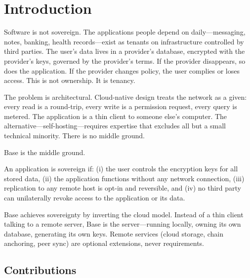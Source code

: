 \section{Introduction}

\label{sec:intro}

Software is not sovereign. The applications people depend on daily---messaging,
notes, banking, health records---exist as tenants on infrastructure controlled
by third parties. The user's data lives in a provider's database, encrypted
with the provider's keys, governed by the provider's terms. If the provider
disappears, so does the application. If the provider changes policy, the user
complies or loses access. This is not ownership. It is tenancy.

The problem is architectural. Cloud-native design treats the network as a given:
every read is a round-trip, every write is a permission request, every query is
metered. The application is a thin client to someone else's computer. The
alternative---self-hosting---requires expertise that excludes all but a small
technical minority. There is no middle ground.

Base is the middle ground.

\begin{definition}
An application is sovereign if: (i) the user controls the encryption keys for
all stored data, (ii) the application functions without any network connection,
(iii) replication to any remote host is opt-in and reversible, and (iv) no
third party can unilaterally revoke access to the application or its data.
\end{definition}

Base achieves sovereignty by inverting the cloud model. Instead of a thin
client talking to a remote server, Base is the server---running locally, owning
its own database, generating its own keys. Remote services (cloud storage, chain
anchoring, peer sync) are optional extensions, never requirements.

\subsection{Contributions}

